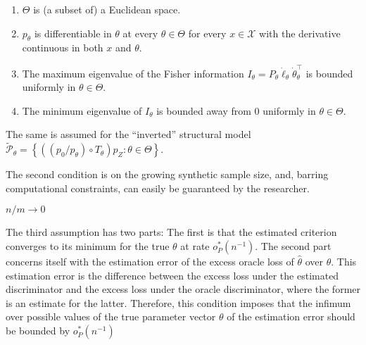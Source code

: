 \begin{assumption}[A1, KMP]
    \label{a:1}
    \begin{enumerate}
        \item $\Theta$ is (a subset of) a Euclidean space.
        \item $p_{\theta}$ is differentiable in $\theta$ at every $\theta \in \Theta$ for every $x \in \mathcal{X}$ with the derivative continuous in both $x$ and $\theta$.
        \item The maximum eigenvalue of the Fisher information $I_{\theta}=P_{\theta} \dot{\ell}_{\theta} \dot{\theta}_{\theta}^{\top}$ is bounded uniformly in $\theta \in \Theta$.
        \item The minimum eigenvalue of $I_{\theta}$ is bounded away from 0 uniformly in $\theta \in \Theta$.
    \end{enumerate}
    The same is assumed for the ``inverted'' structural model $\widetilde{\mathcal{P}}_{\theta}=\left\{\left(\left(p_{0} / p_{\theta}\right) \circ T_{\theta}\right) p_{Z}: \theta \in \Theta\right\}$.
\end{assumption}

The second condition is on the growing synthetic sample size, and, barring computational constraints, can easily be guaranteed by the researcher. %
\begin{assumption}[A2, KMP]
    \label{a:2}
    $n/m \rightarrow 0$
\end{assumption}

The third assumption has two parts: 
The first is that the estimated criterion converges to its minimum for the true $\theta$ at rate $o^{*}_P(n^{-1})$. %
The second part concerns itself with the estimation error of the excess oracle loss of $\hat{\theta}$ over $\theta$. 
This estimation error is the difference between the excess loss under the estimated discriminator and the excess loss under the oracle discriminator, where the former is an estimate for the latter. 
Therefore, this condition imposes that the infimum over possible values of the true parameter vector $\theta$ of the estimation error should be bounded by $o_P^{\ast}(n^{-1})$

